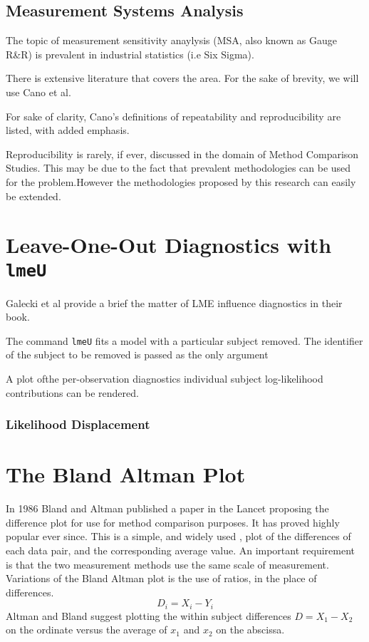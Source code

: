 \documentclass[12pt, a4paper]{report}
\begin{document}
\subsection*{Measurement Systems Analysis}The topic of measurement sensitivity anaylysis (MSA, also known as Gauge R\&R) is prevalent in industrial statistics (i.e Six Sigma).

There is extensive literature that covers the area. For the sake of brevity, we will use Cano et al.

For sake of clarity, Cano's definitions of repeatability and reproducibility are listed, with added emphasis.

Reproducibility is rarely, if ever, discussed in the domain of Method Comparison Studies. This may be due to the fact that prevalent methodologies can be used for the problem.However
the methodologies proposed by this research can easily be extended.






\section*{Leave-One-Out Diagnostics with \texttt{lmeU}}
Galecki et al provide a brief the matter of LME influence diagnostics in their book.

The command \texttt{lmeU} fits a model with a particular subject removed. The identifier of the subject to be removed is passed as the only argument

A plot ofthe per-observation diagnostics individual subject log-likelihood contributions can be rendered.

\subsubsection*{Likelihood Displacement}


\section{The Bland Altman Plot}
In 1986 Bland and Altman published a paper in the Lancet proposing
the difference plot for use for method comparison purposes. It has
proved highly popular ever since. This is a simple, and widely
used , plot of the differences of each data pair, and the
corresponding average value. An important requirement is that the
two measurement methods use the same scale of measurement.
\\
Variations of the Bland Altman plot is the use of ratios, in the
place of differences.
\begin{equation}
D_{i} = X_{i} - Y_{i}   \label{BA01}
\end{equation}
Altman and Bland suggest plotting the within subject differences $
D = X_{1} - X_{2} $ on the ordinate versus the average of $x_{1}$
and  $x_{2}$ on the abscissa.
\end{document}

